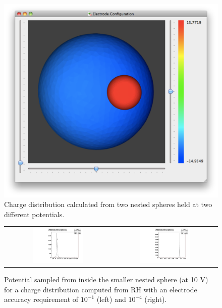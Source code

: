 \begin{figure}[htbp]
\begin{center}
\includegraphics[width=\textwidth]{images/KEMFieldPlots/nestedSpheres.pdf}
\caption{Charge distribution calculated from two nested spheres held at two different potentials.}
\label{fig:nested_spheres}
\end{center}
\end{figure}

\begin{figure}[htbp]
\begin{center}
\begin{tabular}{c c}
\includegraphics[width=0.5\textwidth]{images/KEMFieldPlots/sphereHist_10e-1.pdf} &
\includegraphics[width=0.5\textwidth]{images/KEMFieldPlots/sphereHist_10e-4.pdf} \\
\end{tabular}
\caption{Potential sampled from inside the smaller nested sphere (at 10 V) for a charge distribution computed from RH with an electrode accuracy requirement of $10^{-1}$ (left) and $10^{-4}$ (right).}
\label{fig:ns_results}
\end{center}
\end{figure}


